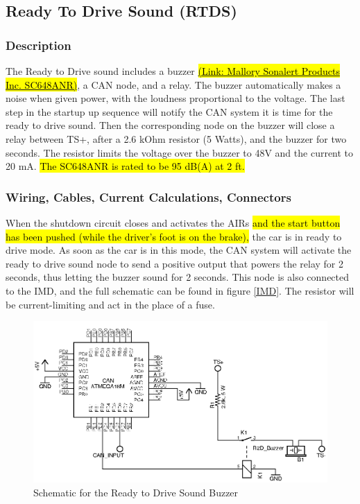 \documentclass{article}
\DeclareRobustCommand{\hlr}[1]{{\sethlcolor{red}\hl{#1}}}
\begin{document}
    \subsection{Ready To Drive Sound (RTDS)} \label{R2Dsection}

        \subsubsection{Description}

            The Ready to Drive sound includes a buzzer \href{http://www.mallory-sonalert.com/Specifications/SC648ANR.pdf}{\hlr{(Link: Mallory Sonalert Products Inc. SC648ANR)}}, a CAN node, and a relay. The buzzer automatically makes a noise when given power, with the loudness proportional to the voltage. The last step in the startup up sequence will notify the CAN system it is time for the ready to drive sound. Then the corresponding node on the buzzer will close a relay between TS+, after a 2.6 kOhm resistor (5 Watts), and the buzzer for two seconds. The resistor limits the voltage over the buzzer to 48V and the current to 20 mA. \hlr{The SC648ANR is rated to be 95 dB(A) at 2 ft.}

        \subsubsection{Wiring, Cables, Current Calculations, Connectors}

            When the shutdown circuit closes and activates the AIRs \hlr{and the start button has been pushed (while the driver's foot is on the brake),} the car is in ready to drive mode. As soon as the car is in this mode, the CAN system will activate the ready to drive sound node to send a positive output that powers the relay for 2 seconds, thus letting the buzzer sound for 2 seconds. This node is also connected to the IMD, and the full schematic can be found in figure \ref{IMD}. The resistor will be current-limiting and act in the place of a fuse. 
            
                \begin{figure}[H]
                    \centering
                    \includegraphics[width = 0.9 \textwidth]{R2Dsoundbuzzerschem}
                    \caption{Schematic for the Ready to Drive Sound Buzzer}
                    \label{R2D}
                \end{figure}
            
\end{document}
